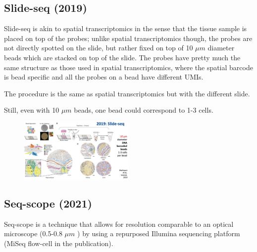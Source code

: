 \hypertarget{slide-seq-2019}{%
\subsection{Slide-seq (2019)}\label{slide-seq-2019}}

Slide-seq is akin to spatial transcriptomics in the sense that the tissue
sample is placed on top of the probes; unlike spatial transcriptomics though, 
the probes are not directly spotted on the slide, but rather fixed on top of
10 $\mu m$ diameter beads which are stacked on top of the slide. The probes
have pretty much the same structure as those used in spatial transcriptomics,
where the spatial barcode is bead specific and all the probes on a bead have
different UMIs.

The procedure is the same as spatial transcriptomics but with the different
slide.

Still, even with 10 $\mu m$ beads, one bead could correspond to 1-3 cells.

\begin{figure}
\centering
\includegraphics[width=0.5\textwidth]{images/Screenshot_1.png}
\caption{}
\end{figure}

\hypertarget{seq-scope-2021}{%
\subsection{Seq-scope (2021)}\label{seq-scope-2021}}

Seq-scope is a technique that allows for resolution comparable to an optical
microscope (0.5-0.8 $\mu m$ ) by using a repurposed Illumina sequencing 
platform (MiSeq flow-cell in the publication).  

